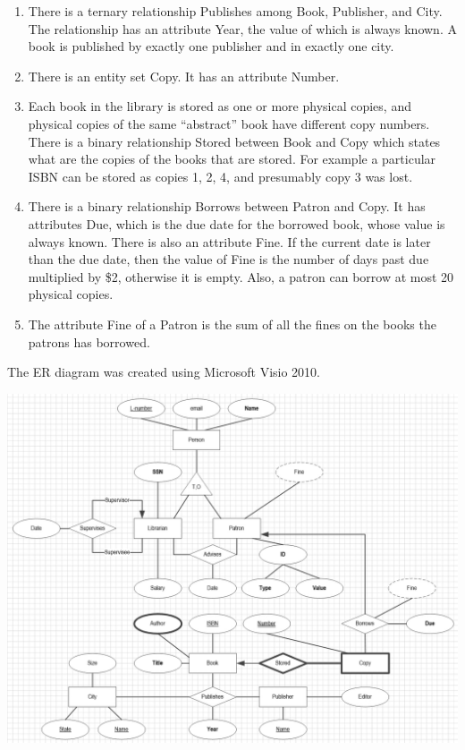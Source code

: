 \documentclass[9pt]{article}
\begin{document}
\begin{enumerate}
    \item There is a ternary relationship Publishes among Book, Publisher, and City. The relationship has an attribute Year, the value of which is always known. A book is published by exactly one publisher and in exactly one city.
    \item There is an entity set Copy. It has an attribute Number.
    \item Each book in the library is stored as one or more physical copies, and physical copies of the same “abstract” book have different copy numbers. There is a binary relationship Stored between Book and Copy which states what are the copies of the books that are stored. For example a particular ISBN can be stored as copies 1, 2, 4, and presumably copy 3 was lost.
    \item There is a binary relationship Borrows between Patron and Copy. It has attributes Due, which is the due date for the borrowed book, whose value is always known. There is also an attribute Fine. If the current date is later than the due date, then the value of Fine is the number of days past due multiplied by \$2, otherwise it is empty. Also, a patron can borrow at most 20 physical copies.
    \item The attribute Fine of a Patron is the sum of all the fines on the books the patrons has borrowed.
\end{enumerate}
The ER diagram was created using Microsoft Visio 2010.
\begin{center}
    \includegraphics[width=180mm]{solution.jpg}
\end{center}
\end{document}

